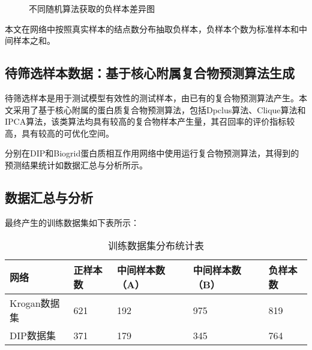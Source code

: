 \begin{figure}[htbp]
    \centering
    \vskip0.5cm
    \caption{不同随机算法获取的负样本差异图}
    \label{fig:diffrent-random-garphs}
\end{figure}


本文在网络中按照真实样本的结点数分布抽取负样本，负样本个数为标准样本和中间样本之和。

\subsection{待筛选样本数据：基于核心附属复合物预测算法生成}
\label{subsection:allSample:coreAttachSampleData}

待筛选样本是用于测试模型有效性的测试样本，由已有的复合物预测算法产生。本文采用了基于核心附属的蛋白质复合物预测算法，包括Dpclus算法、Clique算法和IPCA算法，该类算法均具有较高的复合物样本产生量，其召回率的评价指标较高，具有较高的可优化空间。

分别在DIP和Biogrid蛋白质相互作用网络中使用运行复合物预测算法，其得到的预测结果统计如数据汇总与分析所示。




\subsection{数据汇总与分析}
\label{subsection:allSample:summary}

最终产生的训练数据集如下表所示：

\begin{table}[h]
    \centering
    \caption{训练数据集分布统计表}
    \label{tab:datasets:statistic:train}
    \begin{tabular}{C{3cm}C{2cm}C{3cm}C{3cm}C{2cm}}
        \toprule
        \textbf{网络} & \textbf{正样本数} & \textbf{中间样本数（A）} & \textbf{中间样本数（B）} & \textbf{负样本数} \\
        \midrule
        Krogan数据集  & 621               & 192                      & 975                      & 819               \\
        DIP数据集     & 371               & 179                      & 345                      & 764               \\
        \bottomrule
    \end{tabular}
\end{table}

